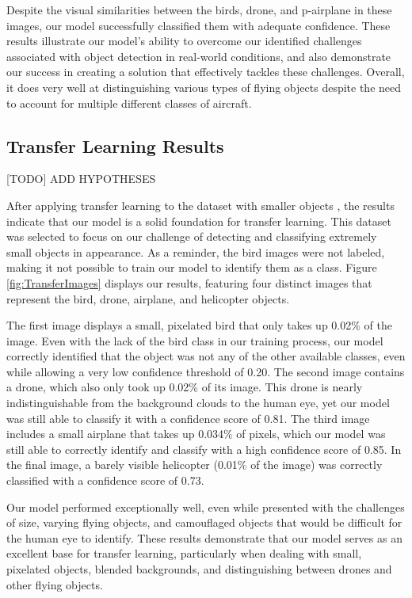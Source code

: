 \documentclass[10pt,twocolumn,letterpaper]{article}
\begin{document}
Despite the visual similarities between the birds, drone, and p-airplane in these images, our model successfully classified them with adequate confidence. These results illustrate our model's ability to overcome our identified challenges associated with object detection in real-world conditions, and also demonstrate our success in creating a solution that effectively tackles these challenges. Overall, it does very well at distinguishing various types of flying objects despite the need to account for multiple different classes of aircraft.

\subsection{Transfer Learning Results}

[TODO] ADD HYPOTHESES

After applying transfer learning to the dataset with smaller objects \cite{TransferDataset}, the results indicate that our model is a solid foundation for transfer learning. This dataset was selected to focus on our challenge of detecting and classifying extremely small objects in appearance. As a reminder, the bird images were not labeled, making it not possible to train our model to identify them as a class. Figure \ref{fig:TransferImages} displays our results, featuring four distinct images that represent the bird, drone, airplane, and helicopter objects.

The first image displays a small, pixelated bird that only takes up 0.02\% of the image. Even with the lack of the bird class in our training process, our model correctly identified that the object was not any of the other available classes, even while allowing a very low confidence threshold of 0.20. The second image contains a drone, which also only took up 0.02\% of its image. This drone is nearly indistinguishable from the background clouds to the human eye, yet our model was still able to classify it with a confidence score of 0.81. The third image includes a small airplane that takes up 0.034\% of pixels, which our model was still able to correctly identify and classify with a high confidence score of 0.85. In the final image, a barely visible helicopter (0.01\% of the image) was correctly classified with a confidence score of 0.73.

Our model performed exceptionally well, even while presented with the challenges of size, varying flying objects, and camouflaged objects that would be difficult for the human eye to identify. These results demonstrate that our model serves as an excellent base for transfer learning, particularly when dealing with small, pixelated objects, blended backgrounds, and distinguishing between drones and other flying objects.
\end{document}
